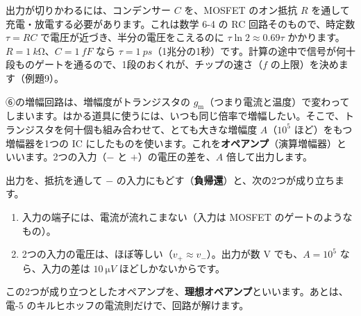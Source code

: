 出力が切りかわるには、コンデンサー $C$ を、MOSFET のオン抵抗 $R$ を通して充電・放電する必要があります。これは数学 6-4 の RC 回路そのもので、時定数 $\tau=RC$ で電圧が近づき、半分の電圧をこえるのに $\tau\ln2\approx0.69\tau$ かかります。$R=\qty{1}{k\ohm}$、$C=\qty{1}{fF}$ なら $\tau=\qty{1}{ps}$（1兆分の1秒）です。計算の途中で信号が何十段ものゲートを通るので、1段のおくれが、チップの速さ（$f$ の上限）を決めます（例題9）。

\phkokomade


\label{ph:原-10:sec8}
⑥の増幅回路は、増幅度がトランジスタの $g_{\mathrm m}$（つまり電流と温度）で変わってしまいます。はかる道具に使うには、いつも同じ倍率で増幅したい。そこで、トランジスタを何十個も組み合わせて、とても大きな増幅度 $A$（$10^5$ ほど）をもつ増幅器を1つの IC にしたものを使います。これを\textbf{オペアンプ}（演算増幅器）といいます。2つの入力（$-$ と $+$）の電圧の差を、$A$ 倍して出力します。

出力を、抵抗を通して $-$ の入力にもどす（\textbf{負帰還}）と、次の2つが成り立ちます。
\begin{enumerate}[label={\bkcircled{\arabic*}}, leftmargin=2.4\zw, itemsep=1pt, topsep=2pt]
\item 入力の端子には、電流が流れこまない（入力は MOSFET のゲートのようなもの）。
\item 2つの入力の電圧は、ほぼ等しい（$v_+\approx v_-$）。出力が数 V でも、$A=10^5$ なら、入力の差は $\qty{10}{\micro V}$ ほどしかないからです。
\end{enumerate}
この2つが成り立つとしたオペアンプを、\textbf{理想オペアンプ}といいます。あとは、電-5 のキルヒホッフの電流則だけで、回路が解けます。

